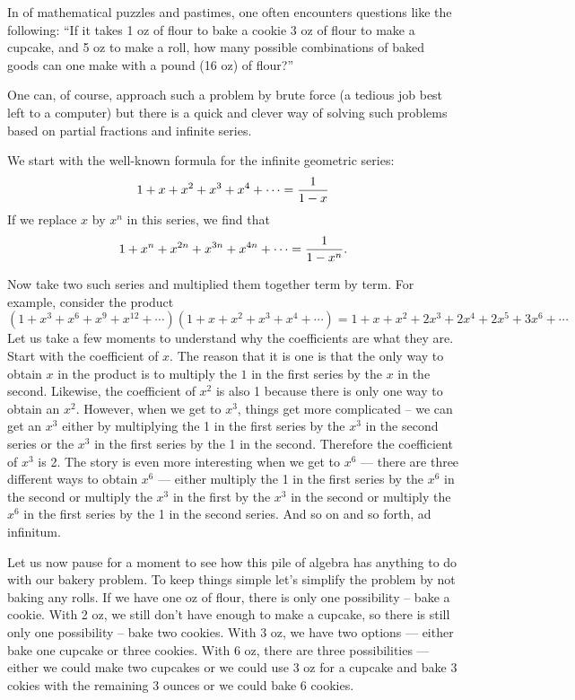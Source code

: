\documentclass[12pt]{article}
\begin{document}
In  of mathematical puzzles and pastimes, one often encounters questions like the following: ``If it takes 1 oz of flour to bake a cookie 3 oz of flour to make a cupcake, and 5 oz to make a roll, how many possible combinations of baked goods can one make with a pound (16 oz) of flour?''

One can, of course, approach such a problem by brute force (a tedious job best left to a computer) but there is a quick and clever way of solving such problems based on partial fractions and infinite series.

We start with the well-known formula for the infinite geometric series:
 $$1 + x + x^2 + x^3 + x^4 + \cdots = {1 \over 1 - x}$$
If we replace $x$ by $x^n$ in this series, we find that
 $$1 + x^n + x^{2n} + x^{3n} + x^{4n} + \cdots = {1 \over 1 - x^n}.$$

Now take two such series and multiplied them together term by term.  For example, consider the product
 $$(1 + x^3 + x^6 + x^9 + x^{12} + \cdots)(1 + x + x^2 + x^3 + x^4 + \cdots) = 1 + x + x^2 + 2 x^3 + 2 x^4 + 2 x^5 + 3 x^6 + \cdots$$
Let us take a few moments to understand why the coefficients are what they are.  Start with the coefficient of $x$.  The reason that it is one is that the only way to obtain $x$ in the product is to multiply the $1$ in the first series by the $x$ in the second.  Likewise, the coefficient of $x^2$ is also 1 because there is only one way to obtain an $x^2$.  However, when we get to $x^3$, things get more complicated -- we can get an $x^3$ either by multiplying the 1 in the first series by the $x^3$ in the second series or the $x^3$ in the first series by the 1 in the second.  Therefore the coefficient of $x^3$ is 2.  The story is even more interesting when we get to $x^6$ --- there are three different ways to obtain $x^6$ --- either multiply the 1 in the first series by the $x^6$ in the second or multiply the $x^3$ in the first by the $x^3$ in the second or multiply the $x^6$ in the first series by the 1 in the second series.  And so on and so forth, ad infinitum.

Let us now pause for a moment to see how this pile of algebra has anything to do with our bakery problem.  To keep things simple let's simplify the problem by not baking any rolls.  If we have one oz of flour, there is only one possibility -- bake a cookie.  With 2 oz, we still don't have enough to make a cupcake, so there is still only one possibility -- bake two cookies.  With 3 oz, we have two options --- either bake one cupcake or three cookies.  With 6 oz, there are three possibilities --- either we could make two cupcakes or we could use 3 oz for a cupcake and bake 3 cokies with the remaining 3 ounces or we could bake 6 cookies.
\end{document}
